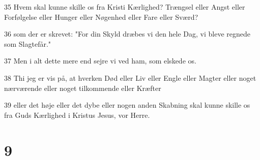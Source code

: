 \par 35 Hvem skal kunne skille os fra Kristi Kærlighed? Trængsel eller Angst eller Forfølgelse eller Hunger eller Nøgenhed eller Fare eller Sværd?
\par 36 som der er skrevet: "For din Skyld dræbes vi den hele Dag, vi bleve regnede som Slagtefår."
\par 37 Men i alt dette mere end sejre vi ved ham, som elskede os.
\par 38 Thi jeg er vis på, at hverken Død eller Liv eller Engle eller Magter eller noget nærværende eller noget tilkommende eller Kræfter
\par 39 eller det høje eller det dybe eller nogen anden Skabning skal kunne skille os fra Guds Kærlighed i Kristus Jesus, vor Herre.

\chapter{9}

